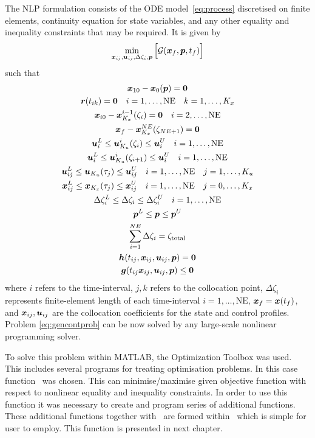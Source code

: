 The NLP formulation consists of the ODE model~\eqref{eq:process}
discretised on finite elements, continuity equation for state
variables, and any other equality and inequality constraints that may
be required. It is given by 
\begin{equation}
\min_{\ve{x}_{ij},\ve{u}_{ij},\Delta\zeta_{i},\ve{p}}\Big[\mf{G}(\ve{x}_{f},\ve{p},t_{f})\Big]
\label{eq:nlpform} 
\end{equation}
such that
\begin{gather*}
\ve{x}_{10}-\ve{x}_{0}(\ve{p}) = \ve{0}\\
\ve{r}(t_{ik}) = \ve{0} \quad i=1,\ldots,\textrm{NE} \quad k=1,\ldots,K_{x}\\
\ve{x}_{i0} - \ve{x}_{K_{x}}^{i-1}(\zeta_{i}) = \ve{0} \quad
i=2,\ldots,\textrm{NE}\\
\ve{x}_{f} - \ve{x}_{K_{x}}^{NE}(\zeta_{NE+1}) = \ve{0}\\ 
\ve{u}_{i}^{L} \leq \ve{u}_{K_{u}}^{i}(\zeta_{i}) \leq \ve{u}_{i}^{U} \quad
i=1,\ldots,\textrm{NE}\\ 
\ve{u}_{i}^{L} \leq \ve{u}_{K_{u}}^{i}(\zeta_{i+1}) \leq \ve{u}_{i}^{U}
\quad i=1,\ldots,\textrm{NE}\\
\ve{u}_{ij}^{L} \leq \ve{u}_{K_{u}}(\tau_{j}) \leq \ve{u}_{ij}^{U} \quad
i=1,\ldots,\textrm{NE} \quad j=1,\ldots,K_{u}\\
\ve{x}_{ij}^{L} \leq \ve{x}_{K_{x}}(\tau_{j}) \leq \ve{x}_{ij}^{U} \quad
i=1,\ldots,\textrm{NE} \quad j=0,\ldots,K_{x}\\
\Delta\zeta_{i}^{L}\leq\Delta\zeta_{i}\leq\Delta\zeta_{i}^{U} \quad
i=1,\ldots,\textrm{NE}\\
\ve{p}^{L} \leq \ve{p} \leq \ve{p}^{U}\\
\sum_{i=1}^{NE}\Delta\zeta_{i} = \zeta_{\textnormal{total}}\\
\ve{h}(t_{ij},\ve{x}_{ij},\ve{u}_{ij},\ve{p}) = \ve{0}\\
\ve{g}(t_{ij}\ve{x}_{ij},\ve{u}_{ij},\ve{p}) \leq \ve{0} 
\end{gather*} where $i$ refers to the time-interval, $j, k$ refers to
the collocation point, $\Delta\zeta_{i}$ represents finite-element
length of each time-interval $i=1,\ldots,\textrm{NE}$, $\ve{x}_{f} =
\ve{x}(t_{f})$, and $\ve{x}_{ij}, \ve{u}_{ij}$ are the collocation
coefficients for the state and control profiles. Problem
\eqref{eq:gencontprob} can be now solved by any large-scale nonlinear
programming solver.

To solve this problem within MATLAB, the Optimization Toolbox was
used. This includes several programs for treating optimisation
problems. In this case function~ was chosen. This can
minimise/maximise given objective function with respect to nonlinear
equality and inequality constraints. In order to use this function it
was necessary to create and program series of additional
functions. These additional functions together with~ are
formed within~ which is simple for user to employ. This
function is presented in next chapter. 



